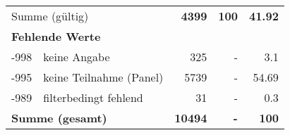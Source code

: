 \begin{longtable}{lXrrr}
     \midrule
     \multicolumn{2}{l}{Summe (gültig)} &
       \textbf{\num{4399}} &
     \textbf{\num{100}} &
       \textbf{\num[round-mode=places,round-precision=2]{41.92}} \\
     \multicolumn{5}{l}{\textbf{Fehlende Werte}}\\
       -998 &
       keine Angabe &
         \num{325} &
        - &
         \num[round-mode=places,round-precision=2]{3.1} \\
       -995 &
       keine Teilnahme (Panel) &
         \num{5739} &
        - &
         \num[round-mode=places,round-precision=2]{54.69} \\
       -989 &
       filterbedingt fehlend &
         \num{31} &
        - &
         \num[round-mode=places,round-precision=2]{0.3} \\
     \midrule
     \multicolumn{2}{l}{\textbf{Summe (gesamt)}} &
          \textbf{\num{10494}} &
        \textbf{-} &
        \textbf{\num{100}} \\
     \bottomrule
     \end{longtable}
     
